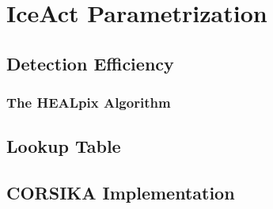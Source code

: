 \chapter{IceAct Parametrization}

\section{Detection Efficiency}

\subsection{The HEALpix Algorithm}

\section{Lookup Table}

\section{CORSIKA Implementation}
